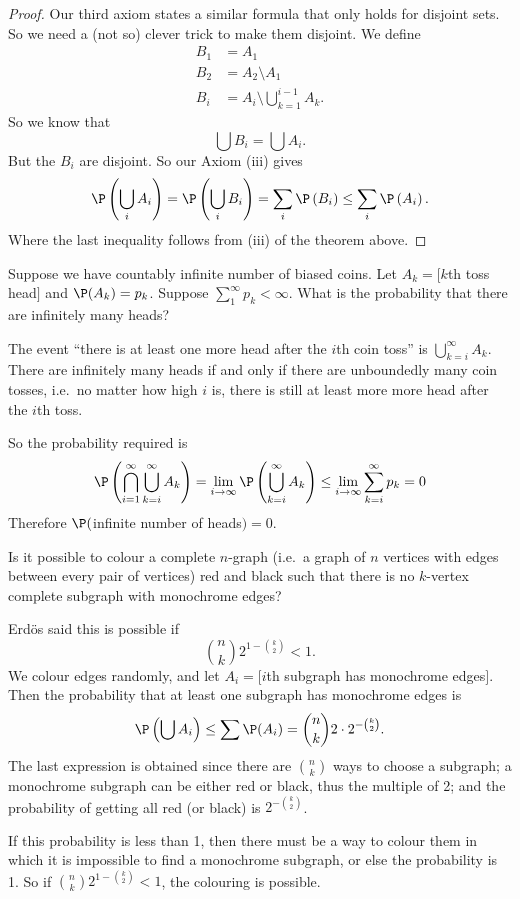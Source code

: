 \documentclass[a4paper]{article}
\begin{document}
\begin{proof}
  Our third axiom states a similar formula that only holds for disjoint sets. So we need a (not so) clever trick to make them disjoint. We define
  \begin{align*}
    B_1 &= A_1\\
    B_2 &= A_2\setminus A_1\\
    B_i &= A_i\setminus \bigcup_{k = 1}^{i - 1}A_k.
  \end{align*}
  So we know that
  \[
    \bigcup B_i = \bigcup A_i.
  \]
  But the $B_i$ are disjoint. So our Axiom (iii) gives
  \[
    \P\left(\bigcup_i A_i\right) = \P\left(\bigcup _i B_i\right) = \sum_i \P\left(B_i\right) \leq \sum_i \P\left(A_i\right).
  \]
  Where the last inequality follows from (iii) of the theorem above.
\end{proof}

\begin{eg}
  Suppose we have countably infinite number of biased coins. Let $A_k = [k$th toss head$]$ and $\P(A_k) = p_k$. Suppose $\sum_1^\infty p_k < \infty$. What is the probability that there are infinitely many heads?

  The event ``there is at least one more head after the $i$th coin toss'' is $\bigcup_{k = i}^\infty A_k$. There are infinitely many heads if and only if there are unboundedly many coin tosses, i.e.\ no matter how high $i$ is, there is still at least more more head after the $i$th toss.

  So the probability required is
  \[
    \P\left(\bigcap_{i = 1}^\infty\bigcup _{k = i}^\infty A_k\right) = \lim_{i \to \infty} \P\left(\bigcup_{k = i}^\infty A_k\right) \leq \lim_{i\to \infty}\sum_{k = i}^\infty p_k = 0
  \]
  Therefore $\P($infinite number of heads$) = 0$.
\end{eg}

\begin{eg}[Erd\"os 1947]
  Is it possible to colour a complete $n$-graph (i.e.\ a graph of $n$ vertices with edges between every pair of vertices) red and black such that there is no $k$-vertex complete subgraph with monochrome edges?

  Erd\"os said this is possible if
  \[
    \binom{n}{k} 2^{1 - \binom{k}{2}} < 1.
  \]
  We colour edges randomly, and let $A_i=[i$th subgraph has monochrome edges$]$. Then the probability that at least one subgraph has monochrome edges is
  \[
    \P\left(\bigcup A_i\right) \leq \sum \P(A_i) = \binom{n}{k} 2\cdot 2^{-\binom{k}{2}}.
  \]
  The last expression is obtained since there are $\binom{n}{k}$ ways to choose a subgraph; a monochrome subgraph can be either red or black, thus the multiple of 2; and the probability of getting all red (or black) is $2^{-\binom{k}{2}}$.

  If this probability is less than 1, then there must be a way to colour them in which it is impossible to find a monochrome subgraph, or else the probability is 1. So if $\binom{n}{k} 2^{1 - \binom{k}{2}} < 1$, the colouring is possible.
\end{eg}
\end{document}
